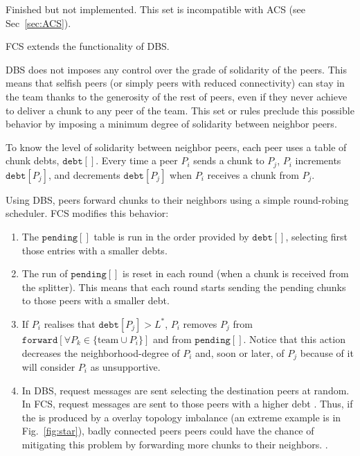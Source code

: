 
\label{sec:FCS}


\begin{notex}
  Finished but not implemented. This set is incompatible with ACS (see Sec~\ref{sec:ACS}).
\end{notex}

FCS extends the functionality of DBS.

DBS does not imposes any control over the grade of solidarity of the
peers. This means that selfish peers (or simply peers with reduced
connectivity) can stay in the team thanks to the generosity of the
rest of peers, even if they never achieve to deliver a chunk to any
peer of the team. This set or rules preclude this possible behavior
by imposing a minimum degree of solidarity between neighbor peers.

To know the level of solidarity between neighbor peers, each peer uses
a table of chunk debts, $\mathtt{debt}[]$. Every time a peer $P_i$
sends a chunk to $P_j$, $P_i$ increments $\mathtt{debt}[P_j]$, and
decrements $\mathtt{debt}[P_j]$ when $P_i$ receives a chunk from
$P_j$. 

Using DBS, peers forward chunks to their neighbors using a simple round-robing scheduler. FCS modifies this behavior:
\begin{enumerate}
\item The $\mathtt{pending}[]$ table is run in the order provided by
  $\mathtt{debt}[]$, selecting first those entries with a smaller
  debts.
\item The run of $\mathtt{pending}[]$ is reset in each round (when a
  chunk is received from the splitter). This means that each round
  starts sending the pending chunks to those peers with a smaller
  debt. 
\item If $P_i$ realises that $\mathtt{debt}[P_j]>L^*$, $P_i$ removes
  $P_j$ from $\mathtt{forward}[\forall P_k\in\{\text{team}\cup P_i\}]$
  and from $\mathtt{pending}[]$. Notice that this action decreases the
  \gls{neighborhood-degree} of $P_i$ and, soon or later, of $P_j$
  because of it will consider $P_i$ as unsupportive.
\item In DBS, request messages are sent selecting the destination peers
  at random. In FCS, request messages are sent to those peers with a
  higher debt . Thus, if the  is produced by a overlay
  topology imbalance (an extreme example is in Fig.~\ref{fig:star}),
  badly connected peers peers could have the chance of mitigating this
  problem by forwarding more chunks to their neighbors. .
\end{enumerate}

